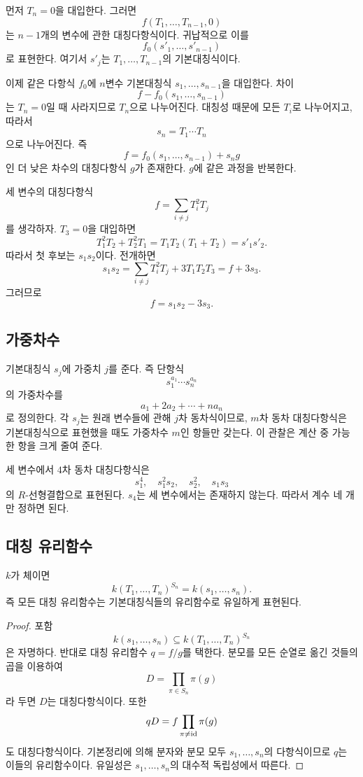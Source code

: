 먼저 $T_n=0$을 대입한다. 그러면
\[
  f(T_1,\dots,T_{n-1},0)
\]
는 $n-1$개의 변수에 관한 대칭다항식이다. 귀납적으로 이를
\[
  f_0(s'_1,\dots,s'_{n-1})
\]
로 표현한다. 여기서 $s'_j$는 $T_1,\dots,T_{n-1}$의 기본대칭식이다.

이제 같은 다항식 $f_0$에 $n$변수 기본대칭식 $s_1,\dots,s_{n-1}$을 대입한다. 차이
\[
  f-f_0(s_1,\dots,s_{n-1})
\]
는 $T_n=0$일 때 사라지므로 $T_n$으로 나누어진다. 대칭성 때문에 모든 $T_i$로 나누어지고, 따라서
\[
  s_n=T_1\cdots T_n
\]
으로 나누어진다. 즉
\[
  f=f_0(s_1,\dots,s_{n-1})+s_ng
\]
인 더 낮은 차수의 대칭다항식 $g$가 존재한다. $g$에 같은 과정을 반복한다.

\begin{example}
세 변수의 대칭다항식
\[
  f=\sum_{i\ne j}T_i^2T_j
\]
를 생각하자. $T_3=0$을 대입하면
\[
  T_1^2T_2+T_2^2T_1
  =T_1T_2(T_1+T_2)
  =s'_1s'_2.
\]
따라서 첫 후보는 $s_1s_2$이다. 전개하면
\[
  s_1s_2
  =\sum_{i\ne j}T_i^2T_j+3T_1T_2T_3
  =f+3s_3.
\]
그러므로
\[
  f=s_1s_2-3s_3.
\]
\end{example}

\subsection{가중차수}

기본대칭식 $s_j$에 가중치 $j$를 준다. 즉 단항식
\[
  s_1^{a_1}\cdots s_n^{a_n}
\]
의 가중차수를
\[
  a_1+2a_2+\cdots+na_n
\]
로 정의한다. 각 $s_j$는 원래 변수들에 관해 $j$차 동차식이므로, $m$차 동차 대칭다항식은 기본대칭식으로 표현했을 때도 가중차수 $m$인 항들만 갖는다. 이 관찰은 계산 중 가능한 항을 크게 줄여 준다.

\begin{example}
세 변수에서 $4$차 동차 대칭다항식은
\[
  s_1^4,\quad s_1^2s_2,\quad s_2^2,\quad s_1s_3
\]
의 $R$-선형결합으로 표현된다. $s_4$는 세 변수에서는 존재하지 않는다. 따라서 계수 네 개만 정하면 된다.
\end{example}

\subsection{대칭 유리함수}

\begin{theorem}
$k$가 체이면
\[
  k(T_1,\dots,T_n)^{S_n}
  =k(s_1,\dots,s_n).
\]
즉 모든 대칭 유리함수는 기본대칭식들의 유리함수로 유일하게 표현된다.
\end{theorem}

\begin{proof}
포함
\[
  k(s_1,\dots,s_n)\subseteq k(T_1,\dots,T_n)^{S_n}
\]
은 자명하다. 반대로 대칭 유리함수 $q=f/g$를 택한다. 분모를 모든 순열로 옮긴 것들의 곱을 이용하여
\[
  D=\prod_{\pi\in S_n}\pi(g)
\]
라 두면 $D$는 대칭다항식이다. 또한
\[
  qD=f\prod_{\pi\ne\operatorname{id}}\pi(g)
\]
도 대칭다항식이다. 기본정리에 의해 분자와 분모 모두 $s_1,\dots,s_n$의 다항식이므로 $q$는 이들의 유리함수이다. 유일성은 $s_1,\dots,s_n$의 대수적 독립성에서 따른다.
\end{proof}

